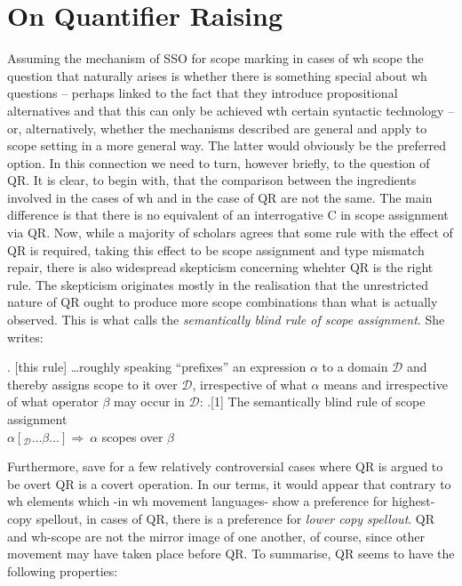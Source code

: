 \documentclass[11pt]{article}
\begin{document}
\section{On Quantifier Raising}
Assuming the mechanism of SSO for scope marking in cases of wh scope the question that naturally arises is whether there is something special about wh questions -- perhaps linked to the fact that they introduce propositional alternatives and that this can only be achieved wth certain syntactic technology -- or, alternatively, whether the mechanisms described are general and apply to scope setting in a more general way.  The latter would obviously be the preferred option.  In this connection we need to turn, however briefly, to the question of QR.  It is clear, to begin with, that the comparison between the ingredients involved in the cases of wh and in the case of QR are not the same.  The main difference is that there is no equivalent of an interrogative C in scope assignment via QR.  Now, while a majority of scholars agrees that some rule with the effect of QR is required, taking this effect to be scope assignment and type mismatch repair, there is also widespread skepticism concerning whehter QR is the right rule.  The skepticism originates mostly in the realisation that the unrestricted nature of QR ought to produce more scope combinations than what is actually observed. This is what\cite{szabolcsi:1997c} calls the
\emph{semantically blind rule of scope assignment}.  She writes:

\ex.  [this rule] \ldots roughly speaking ``prefixes'' an expression
$\alpha$ to a domain $\mathcal{D}$ and thereby assigns scope to it
over $\mathcal{D}$, irrespective of what $\alpha$ means and
irrespective of what operator $\beta$ may occur in $\mathcal{D}$:
\ex.[1] The semantically blind rule of scope assignment\\
 $\alpha[_{\mathcal{D}} \ldots \beta \ldots] \Rightarrow \ 
\alpha$ scopes over $ \beta$
\begin{flushright}
\cite[109]{szabolcsi:1997c}
\end{flushright}

Furthermore, save for a few relatively controversial cases where QR is argued to be overt \citep{fox-nissenbaum:99} QR is a covert operation.  In our terms, it would appear that contrary to wh elements which -in wh movement languages- show a preference for highest-copy spellout, in cases of QR, there is a preference for  \textit{lower copy spellout}.  QR and wh-scope are not the mirror image of one another, of course, since other movement may have taken place before QR.  To summarise, QR seems to have the following properties:
\end{document}
